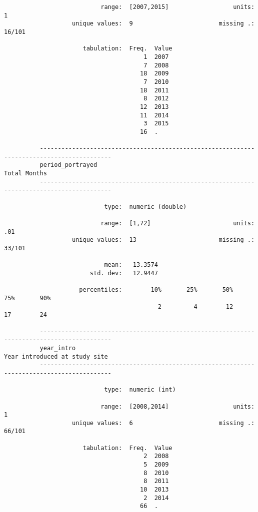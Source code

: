 \documentclass{article}
\begin{document}
\begin{verbatim}
                           range:  [2007,2015]                  units:  1
                   unique values:  9                        missing .:  16/101
          
                      tabulation:  Freq.  Value
                                       1  2007
                                       7  2008
                                      18  2009
                                       7  2010
                                      18  2011
                                       8  2012
                                      12  2013
                                      11  2014
                                       3  2015
                                      16  .
          
          ------------------------------------------------------------------------------------------
          period_portrayed                                                              Total Months
          ------------------------------------------------------------------------------------------
          
                            type:  numeric (double)
          
                           range:  [1,72]                       units:  .01
                   unique values:  13                       missing .:  33/101
          
                            mean:   13.3574
                        std. dev:   12.9447
          
                     percentiles:        10%       25%       50%       75%       90%
                                           2         4        12        17        24
          
          ------------------------------------------------------------------------------------------
          year_intro                                                   Year introduced at study site
          ------------------------------------------------------------------------------------------
          
                            type:  numeric (int)
          
                           range:  [2008,2014]                  units:  1
                   unique values:  6                        missing .:  66/101
          
                      tabulation:  Freq.  Value
                                       2  2008
                                       5  2009
                                       8  2010
                                       8  2011
                                      10  2013
                                       2  2014
                                      66  .
          

\end{verbatim}
\end{document}
